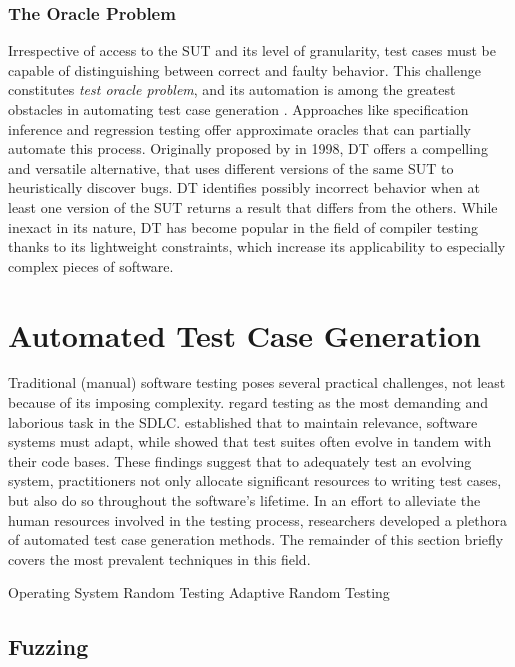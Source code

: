 \subsubsection{The Oracle Problem}

Irrespective of access to the \gls{SUT}
and its level of granularity, test cases must be capable
of distinguishing between correct and faulty behavior.
This challenge constitutes
\textit{test oracle problem}, and its automation is among the 
greatest obstacles in automating test case generation \citep{barr2014oracle}.
Approaches like specification inference and regression testing offer
approximate oracles that can partially automate this process.
Originally proposed by \citet{mckeeman1998differential} in 1998, \Gls{DT}
offers a compelling and versatile alternative, that uses different versions
of the same \gls{SUT} to heuristically discover bugs.
\gls{DT} identifies possibly incorrect behavior when at least
one version of the \gls{SUT} returns a result that differs from the others.
While inexact in its nature, \gls{DT} has become popular
in the field of compiler testing thanks to its lightweight 
constraints, which increase its applicability to especially complex
pieces of software.

\section{Automated Test Case Generation}

Traditional (manual) software testing poses several practical
challenges, not least because of its imposing complexity.
\citet{candea2019automated} regard testing as the most
demanding and laborious task in the \gls{SDLC}.
\citet{lehman1979understanding} established that to maintain
relevance, software systems must adapt, while \citet{zaidman2011studying}
showed that test suites often evolve in tandem with their code bases.
These findings suggest that to adequately test an evolving system,
practitioners not only allocate significant resources to writing test cases,
but also do so throughout the software's lifetime.
In an effort to alleviate the human resources involved in the testing process,
researchers developed a plethora of automated test case generation methods.
The remainder of this section briefly covers the most prevalent techniques
in this field.

 {Operating System}
 {Random Testing}
 {Adaptive Random Testing}

\subsection{Fuzzing}

